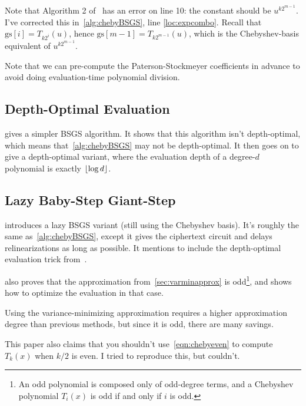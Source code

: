 \documentclass[../fheimpl.tex]{subfiles}
\begin{document}
Note that Algorithm 2 of~\cite{cryptoeprint:2018/1043} has an error on line 10: the constant should be $u^{k2^{m-1}}$. I've corrected this in~\cref{alg:chebyBSGS}, line \ref{loc:expcombo}. Recall that $\mathrm{gs}[i] = T_{k2^i}(u)$, hence $\mathrm{gs}[m-1]=T_{k2^{m-1}}(u)$, which is the Chebyshev-basis equivalent of $u^{k2^{m-1}}$.

Note that we can pre-compute the Paterson-Stockmeyer coefficients in advance to avoid doing evaluation-time polynomial division.

\subsection{Depth-Optimal Evaluation}
\cite{cryptoeprint:2020/1203} gives a simpler BSGS algorithm. It shows that this algorithm isn't depth-optimal, which means that~\cref{alg:chebyBSGS} may not be depth-optimal. It then goes on to give a depth-optimal variant, where the evaluation depth of a degree-$d$ polynomial is exactly $\lfloor\log d\rfloor$.

%	

\subsection{Lazy Baby-Step Giant-Step}
\cite{cryptoeprint:2020/1549} introduces a lazy BSGS variant (still using the Chebyshev basis). It's roughly the same as~\cref{alg:chebyBSGS}, except it gives the ciphertext circuit and delays relinearizations as long as possible. It mentions to include the depth-optimal evaluation trick from~\cite{cryptoeprint:2020/1203}.

\cite{cryptoeprint:2020/1549} also proves that the approximation from~\cref{sec:varminapprox} is odd\footnote{An odd polynomial is composed only of odd-degree terms, and a Chebyshev polynomial $T_i(x)$ is odd if and only if $i$ is odd.}, and shows how to optimize the evaluation in that case.

Using the variance-minimizing approximation requires a higher approximation degree than previous methods, but since it is odd, there are many savings. 

This paper also claims that you shouldn't use~\cref{eqn:chebyeven} to compute $T_k(x)$ when $k/2$ is even. I tried to reproduce this, but couldn't.
\end{document}
